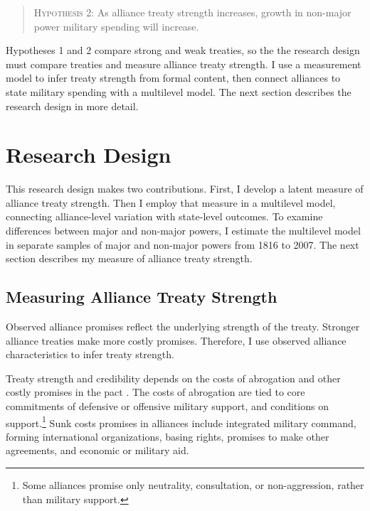 \documentclass[12pt]{article}
\begin{document}
\begin{quote}
\textsc{Hypothesis 2}: As alliance treaty strength increases, growth in non-major power military spending will increase. 
\end{quote}


Hypotheses 1 and 2 compare strong and weak treaties, so the the research design must compare treaties and measure alliance treaty strength.  
I use a measurement model to infer treaty strength from formal content, then connect alliances to state military spending with a multilevel model. 
The next section describes the research design in more detail. 



\section{Research Design} 


This research design makes two contributions. 
First, I develop a latent measure of alliance treaty strength. 
Then I employ that measure in a multilevel model, connecting alliance-level variation with state-level outcomes. 
To examine differences between major and non-major powers, I estimate the multilevel model in separate samples of major and non-major powers from 1816 to 2007. 
The next section describes my measure of alliance treaty strength. 


\subsection{Measuring Alliance Treaty Strength} 

Observed alliance promises reflect the underlying strength of the treaty. 
Stronger alliance treaties make more costly promises. 
Therefore, I use observed alliance characteristics to infer treaty strength.


Treaty strength and credibility depends on the costs of abrogation and other costly promises in the pact \citep{Leeds2003}. 
The costs of abrogation are tied to core commitments of defensive or offensive military support, and conditions on support.\footnote{Some alliances promise only neutrality, consultation, or non-aggression, rather than military support.}  
Sunk costs promises in alliances include integrated military command, forming international organizations, basing rights, promises to make other agreements, and economic or military aid. 
\end{document}

